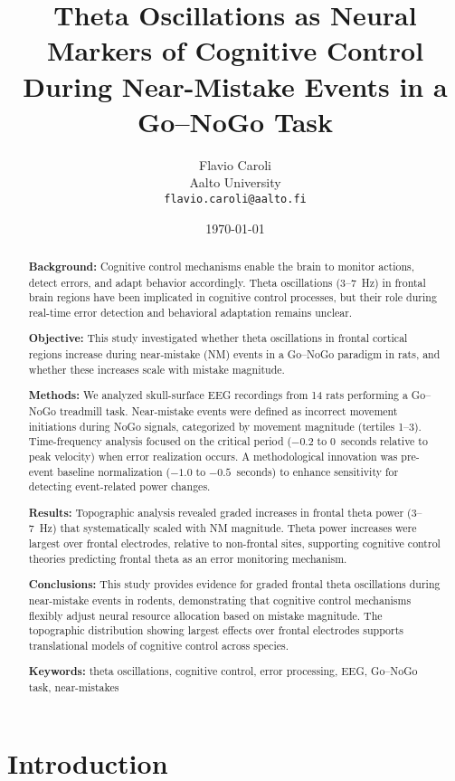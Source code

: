 \documentclass[11pt]{article}
\title{Theta Oscillations as Neural Markers of Cognitive Control During Near-Mistake Events in a Go–NoGo Task}
\author{
  Flavio Caroli \\
  Aalto University \\
  \texttt{flavio.caroli@aalto.fi}
}
\date{\today}
\begin{document}
\maketitle

\begin{abstract}
\textbf{Background:} Cognitive control mechanisms enable the brain to monitor actions, detect errors, and adapt behavior accordingly. Theta oscillations (3--7~Hz) in frontal brain regions have been implicated in cognitive control processes, but their role during real-time error detection and behavioral adaptation remains unclear.

\textbf{Objective:} This study investigated whether theta oscillations in frontal cortical regions increase during near-mistake (NM) events in a Go–NoGo paradigm in rats, and whether these increases scale with mistake magnitude.

\textbf{Methods:} We analyzed skull-surface EEG recordings from 14 rats performing a Go–NoGo treadmill task. Near-mistake events were defined as incorrect movement initiations during NoGo signals, categorized by movement magnitude (tertiles 1--3). Time-frequency analysis focused on the critical period ($-0.2$ to $0$~seconds relative to peak velocity) when error realization occurs. A methodological innovation was pre-event baseline normalization ($-1.0$ to $-0.5$~seconds) to enhance sensitivity for detecting event-related power changes.

\textbf{Results:} Topographic analysis revealed graded increases in frontal theta power (3--7~Hz) that systematically scaled with NM magnitude. Theta power increases were largest over frontal electrodes, relative to non-frontal sites, supporting cognitive control theories predicting frontal theta as an error monitoring mechanism.

\textbf{Conclusions:} This study provides evidence for graded frontal theta oscillations during near-mistake events in rodents, demonstrating that cognitive control mechanisms flexibly adjust neural resource allocation based on mistake magnitude. The topographic distribution showing largest effects over frontal electrodes supports translational models of cognitive control across species.

\textbf{Keywords:} theta oscillations, cognitive control, error processing, EEG, Go–NoGo task, near-mistakes
\end{abstract}

\section{Introduction}
\end{document}
